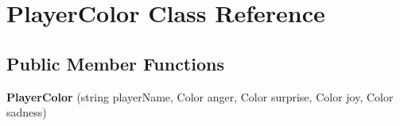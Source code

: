 \hypertarget{class_player_color}{}\section{Player\+Color Class Reference}
\label{class_player_color}
\subsection*{Public Member Functions}
\begin{DoxyCompactItemize}
\item 
\mbox{\label{class_player_color_ab7e30ea4305b0b98aa3239721d5665f0}} 
{\bfseries Player\+Color} (string player\+Name, Color anger, Color surprise, Color joy, Color sadness)
\end{DoxyCompactItemize}

